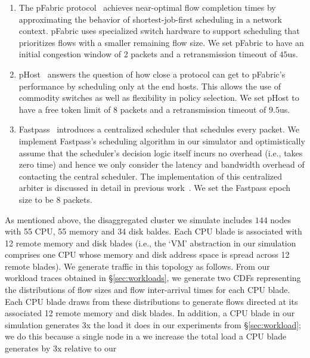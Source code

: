 \begin{enumerate}
\item {} The pFabric protocol~\cite{pfabric} achieves near-optimal flow completion times by approximating the behavior of shortest-job-first scheduling in a network context. pFabric uses specialized switch hardware to support scheduling that prioritizes flows with a smaller remaining flow size. We set pFabric to have an initial congestion window of 2 packets and a retransmission timeout of $45$us.
%
\item {} pHost~\cite{phost} answers the question of how close a protocol can get to pFabric's performance by scheduling only at the end hosts. This allows the use of commodity switches as well as flexibility in policy selection. We set pHost to have a free token limit of 8 packets and a retransmission timeout of $9.5$us.
%
\item {} Fastpass~\cite{fastpass} introduces a centralized scheduler that schedules  every packet. We implement Fastpass's scheduling algorithm in our simulator and optimistically assume that the scheduler's decision logic itself incurs no overhead (i.e., takes zero time) and hence we only consider the latency and bandwidth overhead of contacting the central scheduler. The implementation of this centralized arbiter is discussed in detail in previous work~\cite{phost}. We set the Fastpass epoch size to be 8 packets.%
%
\end{enumerate}



As mentioned above, the disaggregated cluster we simulate includes $144$ nodes 
with 55 CPU, 55 memory and 34 disk baldes. 
Each CPU blade is associated with 12 remote memory and disk blades (i.e., the `VM' abstraction in our simulation comprises one CPU whose memory and disk address space 
is spread across 12 remote blades). 
We generate traffic in this topology as follows. From our workload traces obtained in \S\ref{sec:workloads}, we generate two CDFs representing the distributions of flow 
sizes and flow inter-arrival times for each CPU blade. Each CPU blade draws from these distributions to generate flows directed at its associated 12 remote memory and disk blades. In addition, a CPU blade in our simulation generates 3x the load it does 
in our experiments from \S\ref{sec:workload}; we do this because a single node in a we increase the total load a CPU blade generates by 3x relative 
to our 

